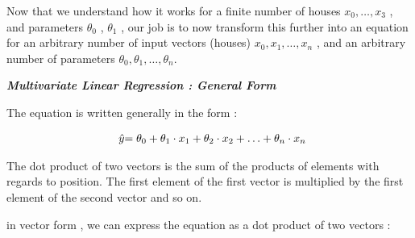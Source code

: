 Now that we understand how it works for a finite number of houses \( x_0 ,
\ldots , x_3 \) , and parameters \( \theta_0 \) , \( \theta_1 \) , our job
is to now transform this further into an equation for an arbitrary number of
input vectors (houses) \( x_0 , x_1 , \ldots , x_n \) , and an arbitrary number
of parameters \( \theta_0 , \theta_1 , \ldots , \theta_n \).


\textbf{\textit{Multivariate Linear Regression : General Form}}

The equation is written generally in
the form :

\[
	\begin{array}{ l@{} l@{}} 
	\hat{y} & = 
	\theta_0
	+ \theta_1 \cdot x_1
	+ \theta_2 \cdot x_2
	+ \ldots
	+ \theta_n \cdot x_n
	\end{array}
\]

The dot product of two vectors is the sum of the products of elements with
regards to position. The first element of the first vector is multiplied by the
first element of the second vector and so on.

in vector form , we can express the equation as a dot product of two
vectors :


